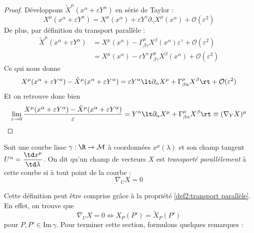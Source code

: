 \begin{proof}
    Développons $\tilde{X}^{\mu}(x^{\alpha} +\varepsilon Y^{\alpha} )$ en série de Taylor :
    \begin{equation}
        X^{\mu}(x^{\alpha} + \varepsilon Y^{\alpha} ) =X^{\mu}(x^{\alpha}) + \varepsilon Y^{\gamma}\partial_{\gamma}X^{\mu}(x^\alpha) + \mathcal{O}(\varepsilon^{2}) 
    \end{equation}
    De plus, par définition du transport parallèle :
    \begin{align}
        \tilde{X}^{\mu}(x^{\alpha} +\varepsilon Y^{\alpha} ) &= X^{\mu}(x^{\alpha}) - \Gamma^{\mu}_{\beta \gamma}X^{\beta}(x^\alpha)\varepsilon^{\gamma} + \mathcal{O}(\varepsilon^2)\\
        & = X^{\mu}(x^{\alpha}) - \varepsilon Y^\gamma \Gamma^{\mu}_{\beta \gamma}X^{\beta}(x^\alpha) + \mathcal{O}(\varepsilon^2)
    \end{align}
    Ce qui nous donne 
    \begin{equation}
        X^{\mu}(x^{\alpha} + \varepsilon Y^{\alpha} ) - \tilde{X}^{\mu}(x^{\alpha} +\varepsilon Y^{\alpha} ) = \varepsilon Y^\alpha \lt \partial_\alpha X^\mu + \Gamma^{\mu}_{\beta \alpha} X^\beta\rt+ \mathcal{O}(\varepsilon^2)
    \end{equation}
    Et on retrouve donc bien 
    \begin{equation}
        \lim_{\varepsilon\to 0} \frac{X^{\mu}(x^{\alpha} + \varepsilon Y^{\alpha} ) - \tilde{X}^{\mu}(x^{\alpha} +\varepsilon Y^{\alpha} )}{\varepsilon} = Y^\alpha \lt \partial_\alpha X^\mu + \Gamma^{\mu}_{\beta \alpha} X^\beta\rt \equiv (\nabla_Y X)^\mu
    \end{equation}
\end{proof}
\begin{theoremframe}
\begin{defi}
    Soit une courbe lisse $\gamma: \R \to \mathcal{M}$ à coordonnées $x^\mu(\lambda)$ et son champ tangent $U^\alpha = \dfrac{\td x^\mu}{\td \lambda}$. On dit qu'un champ de vecteurs $X$ est \emph{transporté parallèlement} à cette courbe si à tout point de la courbe :
    \begin{equation}
        \nabla_U X = 0
    \end{equation}
\end{defi}
\end{theoremframe}
Cette définition peut être comprise grâce à la propriété \ref{def2:transport parallèle}. En effet, on trouve que
\begin{equation}
    \nabla_U X = 0 \iff X_P(P') = \tilde{X}_P(P')
\end{equation}
pour $P,P' \in \mathrm{Im} \, \gamma$. Pour terminer cette section, formulons quelques remarques :

